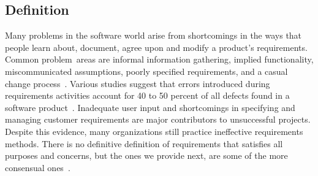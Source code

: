 \documentclass[dissertation,final]{softeng}
\begin{document}
\subsection{Definition}
Many problems in the software world arise from shortcomings in the ways that people learn about, document, agree upon and modify a product's requirements. Common problem~areas are informal information gathering, implied functionality, miscommunicated assumptions, poorly specified requirements, and a casual change process~\citep{Wiegers2013}. Various studies suggest that errors introduced during requirements activities account for 40 to 50 percent of all defects found in a software product~\citep{Davis200505}. Inadequate user input and shortcomings in specifying and managing customer requirements are major contributors to unsuccessful projects. Despite this evidence, many organizations still practice ineffective requirements methods. There is no definitive definition of requirements that satisfies all purposes and concerns, but the ones we provide next, are some of the more consensual ones~\citep{Wiegers2013}.
\end{document}
